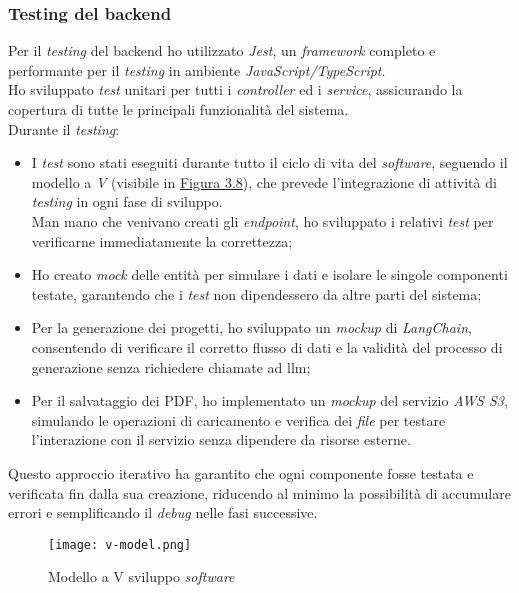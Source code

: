 \subsubsection{Testing del \gls{backend}}  
Per il \textit{testing} del \gls{backend} ho utilizzato \textit{Jest}, un \textit{framework} completo e performante per il \textit{testing} in ambiente \textit{JavaScript/TypeScript}.\\
Ho sviluppato \textit{test} unitari per tutti i \textit{controller} ed i \textit{service}, assicurando la copertura di tutte le principali funzionalità del sistema.\\

\noindent Durante il \textit{testing}:
\begin{itemize}
    \item I \textit{test} sono stati eseguiti durante tutto il ciclo di vita del \textit{software}, seguendo il modello a \textit{V} (visibile in {\hyperref[fig:v-model]{Figura 3.8}}), che prevede l’integrazione di attività di \textit{testing} in ogni fase di sviluppo.\\
    Man mano che venivano creati gli \textit{endpoint}, ho sviluppato i relativi \textit{test} per verificarne immediatamente la correttezza;
    \item Ho creato \textit{mock} delle entità per simulare i dati e isolare le singole componenti testate, garantendo che i \textit{test} non dipendessero da altre parti del sistema;
    \item Per la generazione dei progetti, ho sviluppato un \textit{mockup} di \textit{LangChain}, consentendo di verificare il corretto flusso di dati e la validità del processo di generazione senza richiedere chiamate ad \gls{llm};
    \item Per il salvataggio dei PDF, ho implementato un \textit{mockup} del servizio \textit{AWS S3}, simulando le operazioni di caricamento e verifica dei \textit{file} per testare l’interazione con il servizio senza dipendere da risorse esterne.
\end{itemize}

\noindent Questo approccio iterativo ha garantito che ogni componente fosse testata e verificata fin dalla sua creazione, riducendo al minimo la possibilità di accumulare errori e semplificando il \textit{debug} nelle fasi successive.\\

\begin{figure}[H]
    \centering
    \texttt{[image: v-model.png]}
    \caption{Modello a V sviluppo \textit{software}}
    \label{fig:v-model}  
    \cite{site:v-model}
\end{figure}

